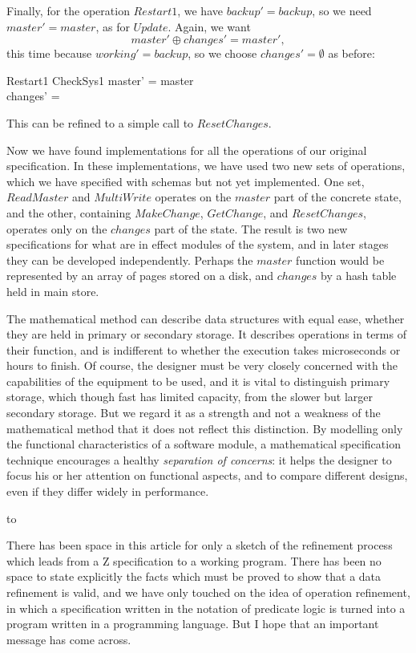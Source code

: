 \documentclass[12pt]{article}
\newcommand{\twinkle}{\par\bigskip
	\hbox to\linewidth{\hfil$*$\qquad$*$\qquad$*$\hfil}\bigskip}
\begin{document}
Finally, for the operation $Restart1$, we have $backup' = backup$, so we need
$master' = master$, as for $Update$.  Again, we want
\[
	master' \oplus changes' = master',
\]
this time because $working' = backup$,
so we choose $changes' = \emptyset$ as before:
\begin{schema}{Restart1}
	\Delta CheckSys1
\where
	master' = master \\
	changes' = \emptyset
\end{schema}
This can be refined to a simple call to $ResetChanges$.

Now we have found implementations for all the operations
of our original specification.
In these implementations, we have used two new sets of operations,
which we have specified with schemas but not yet implemented.
One set, $ReadMaster$ and $MultiWrite$ operates on the $master$ part of
the concrete state, and the other, containing $MakeChange$, $GetChange$,
and $ResetChanges$, operates only on the $changes$ part of the state.
The result is two new specifications for what are in effect modules
of the system, and in later stages they can be developed independently.
Perhaps the $master$ function would be represented by an array of
pages stored on a disk, and $changes$ by a hash table held in
main store.

The mathematical method can describe data structures
with equal ease, whether they are held in primary or
secondary storage. It describes operations in terms of their
function, and is indifferent to whether the execution takes
microseconds or hours to finish. Of course, the designer
must be very closely concerned with the capabilities of the
equipment to be used, and it is vital to distinguish primary
storage, which though fast has limited capacity, from the
slower but larger secondary storage. But we regard it as a
strength and not a weakness of the mathematical method that
it does not reflect this distinction.  
By modelling only the functional characteristics of a software
module, a mathematical specification technique encourages a healthy
{\em separation of concerns}:
it helps the designer to focus his or her attention on functional aspects, and
to compare different designs, even if they differ widely in
performance.

\twinkle

There has been space in this article for only a sketch of the
refinement process which leads from a Z specification to a working
program.  There has been no space to state explicitly the facts which
must be proved to show that a data refinement is valid, and we have
only touched on the idea of operation refinement, in which a
specification written in the notation of predicate logic is turned
into a program written in a programming language.  But I hope that an
important message has come across.
\end{document}
